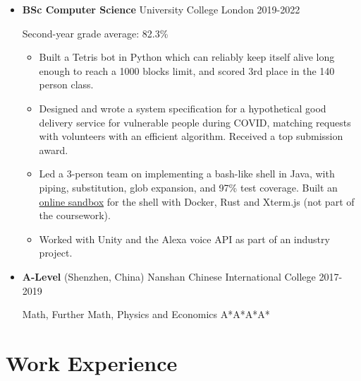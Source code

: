   \begin{itemize}
    \item \textbf{BSc Computer Science} \dashdiv{} University College London \dashdiv{} 2019-2022

      Second-year grade average: 82.3\%

      \begin{itemize}
        \item Built a Tetris bot in Python which can reliably keep itself alive long enough to reach a 1000 blocks limit, and scored 3rd place in the 140 person class.

        \item Designed and wrote a system specification for a hypothetical good delivery service for vulnerable people during COVID, matching requests with volunteers with an efficient algorithm. Received a top submission award.

        \item Led a 3-person team on implementing a bash-like shell in Java, with piping, substitution, glob expansion, and 97\% test coverage. Built an \href{https://jsh-sandbox.maowtm.org}{\color{link}online sandbox} for the shell with Docker, Rust and Xterm.js (not part of the coursework).

        \item Worked with Unity and the Alexa voice API as part of an industry project.
      \end{itemize}

    \item \textbf{A-Level} \dashdiv{} (Shenzhen, China) Nanshan Chinese International College \dashdiv{} 2017-2019

      Math, Further Math, Physics and Economics \dashdiv{} A*A*A*A*
  \end{itemize}

  \section{Work Experience}

